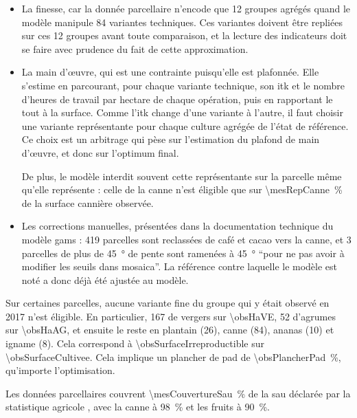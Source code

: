\begin{itemize}[leftmargin=1.2em,itemsep=8pt]

\item La finesse, car la donnée parcellaire n'encode que \num{12} groupes agrégés quand le
  modèle manipule \num{84} variantes techniques. Ces variantes doivent être repliées sur ces
  \num{12} groupes avant toute comparaison, et la lecture des indicateurs doit se faire avec
  prudence du fait de cette approximation.

\item La main d'\oe uvre, qui est une contrainte puisqu'elle est plafonnée. Elle s'estime en
  parcourant, pour chaque variante technique, son \gls{itk} et le nombre d'heures de travail par
  hectare de chaque opération, puis en rapportant le tout à la surface. Comme l'\gls{itk} change
  d'une variante à l'autre, il faut choisir une variante représentante pour chaque culture
  agrégée de l'état de référence. Ce choix est un arbitrage qui pèse sur l'estimation du plafond
  de main d'\oe uvre, et donc sur l'optimum final.

  De plus, le modèle interdit souvent cette représentante sur la parcelle même qu'elle
  représente : celle de la canne n'est éligible que sur \SI{\mesRepCanne}{\percent} de la surface
  cannière observée.

\item Les corrections manuelles, présentées dans la documentation technique du modèle
  \gls{gams} : \num{419} parcelles sont reclassées de café et cacao vers la canne, et \num{3}
  parcelles de plus de \SI{45}{\degree} de pente sont ramenées à \SI{45}{\degree}
  \enquote{pour ne pas avoir à modifier les seuils dans \gls{mosaica}}. La référence contre
  laquelle le modèle est noté a donc déjà été ajustée au modèle.

\end{itemize}

Sur certaines parcelles, aucune variante fine du groupe qui y était observé en \num{2017} n'est
éligible. En particulier, \SI{167}{\ha} de vergers sur \SI{\obsHaVE}{\ha}, \SI{52}{\ha}
d'agrumes sur \SI{\obsHaAG}{\ha}, et ensuite le reste en plantain (\SI{26}{\ha}), canne
(\SI{84}{\ha}), ananas (\SI{10}{\ha}) et igname (\SI{8}{\ha}). Cela correspond à
\SI{\obsSurfaceIrreproductible}{\ha} sur \SI{\obsSurfaceCultivee}{\ha}. Cela implique un
plancher de \gls{pad} de \SI{\obsPlancherPad}{\percent}, qu'importe l'optimisation.

Les données parcellaires couvrent \SI{\mesCouvertureSau}{\percent} de la \gls{sau} déclarée par
la statistique agricole \parencite{agreste2019}, avec la canne à \SI{98}{\percent} et les fruits
à \SI{90}{\percent}.

